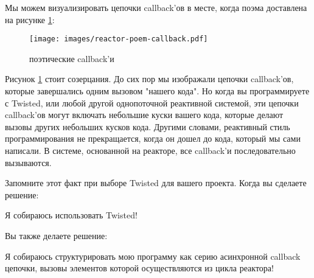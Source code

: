 Мы можем визуализировать цепочки callback'ов в месте, когда 
поэма доставлена на рисунке \ref{fig:reactor-poem-callback}:

\begin{figure}[h]
\begin{center}
    \texttt{[image: images/reactor-poem-callback.pdf]}
    \caption{поэтические callback'и\label{fig:reactor-poem-callback}}
\end{center}
\end{figure}



Рисунок \ref{fig:reactor-poem-callback} стоит созерцания. 
До сих пор мы изображали цепочки callback'ов, которые 
завершались одним вызовом "нашего кода". Но когда вы 
программируете с Twisted, или любой другой однопоточной  
реактивной системой, эти цепочки callback'ов могут включать 
небольшие куски вашего кода, которые делают вызовы других 
небольших кусков кода. Другими словами, реактивный 
стиль программирования не прекращается, когда он дошел до 
кода, который мы сами написали. В системе, основанной на 
реакторе, все callback'и последовательно 
вызываются.

Запомните этот факт при выборе Twisted для вашего проекта. 
Когда вы сделаете решение:


\hspace{10mm}
Я собираюсь использовать Twisted!

Вы также делаете решение:


\hspace{10mm}
Я собираюсь структурировать мою программу как серию 
асинхронной callback цепочки, вызовы элементов которой 
осуществляются из цикла реактора!


